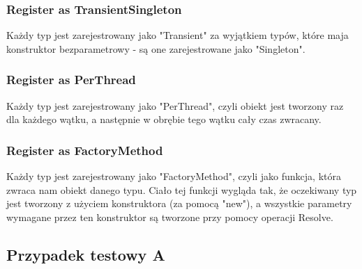 \documentclass[12pt]{article}
\begin{document}
\subsubsection{Register as TransientSingleton}
Każdy typ jest zarejestrowany jako "Transient" za wyjątkiem typów, które maja konstruktor bezparametrowy - są one zarejestrowane jako "Singleton".

\subsubsection{Register as PerThread}
Każdy typ jest zarejestrowany jako "PerThread", czyli obiekt jest tworzony raz dla każdego wątku, a następnie w obrębie tego wątku cały czas zwracany.

\subsubsection{Register as FactoryMethod}
Każdy typ jest zarejestrowany jako "FactoryMethod", czyli jako funkcja, która zwraca nam obiekt danego typu. Ciało tej funkcji wygląda tak, że oczekiwany typ jest tworzony z użyciem konstruktora (za pomocą "new"), a wszystkie parametry wymagane przez ten konstruktor są tworzone przy pomocy operacji Resolve.


\subsection{Przypadek testowy A}
\end{document}
